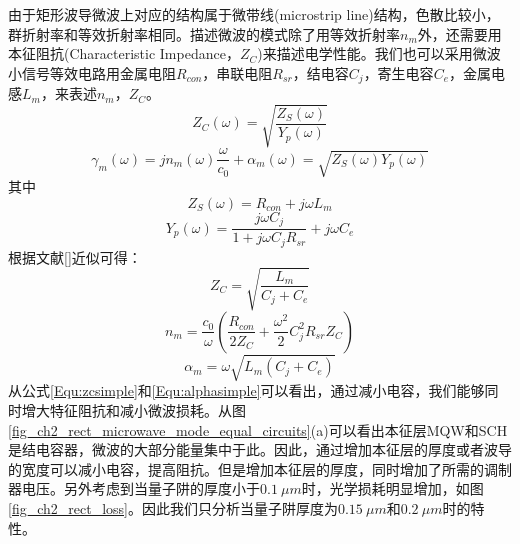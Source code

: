 由于矩形波导微波上对应的结构属于微带线(microstrip  line)结构，色散比较小，群折射率和等效折射率相同。描述微波的模式除了用等效折射率$n_m$外，还需要用本征阻抗(Characteristic Impedance，$Z_C$)来描述电学性能。我们也可以采用微波小信号等效电路用金属电阻$R_{con}$，串联电阻$R_{sr}$，结电容$C_j$，寄生电容$C_e$，金属电感$L_m$，来表述$n_m$，$Z_C$。
\begin{equation}
\label{Equ:zc}
Z_C(\omega) = \sqrt{\frac{Z_S(\omega)}{Y_p(\omega)}}
\end{equation}
\begin{equation}
\label{Equ:gammam}
\gamma_m(\omega) = jn_m(\omega)\frac{\omega}{c_0} + \alpha_m(\omega) = \sqrt{Z_S(\omega)Y_p(\omega)}
\end{equation}
其中
\begin{equation}
\label{Equ:zs}
Z_S(\omega) = R_{con}+j\omega L_m
\end{equation}
\begin{equation}
\label{Equ:yp}
Y_p(\omega) = \frac{j\omega C_j}{1+j\omega C_jR_{sr}}+j\omega C_e
\end{equation}
根据文献[]近似可得：
\begin{equation}
\label{Equ:zcsimple}
Z_C = \sqrt{\frac{L_m}{C_j+C_e}}
\end{equation}
\begin{equation}
\label{Equ:nmsimple}
n_m = \frac{c_0}{\omega}\left(\frac{R_{con}}{2Z_C} + \frac{\omega^2}{2}C^2_jR_{sr}Z_C\right)
\end{equation}
\begin{equation}
\label{Equ:alphasimple}
\alpha_m = \omega\sqrt{L_m(C_j+C_e)}
\end{equation}
从公式\ref{Equ:zcsimple}和\ref{Equ:alphasimple}可以看出，通过减小电容，我们能够同时增大特征阻抗和减小微波损耗。从图\ref{fig_ch2_rect_microwave_mode_equal_circuits}(a)可以看出本征层MQW和SCH是结电容器，微波的大部分能量集中于此。因此，通过增加本征层的厚度或者波导的宽度可以减小电容，提高阻抗。但是增加本征层的厚度，同时增加了所需的调制器电压。另外考虑到当量子阱的厚度小于$0.1 ~\mu m$时，光学损耗明显增加，如图\ref{fig_ch2_rect_loss}。因此我们只分析当量子阱厚度为$0.15~ \mu m$和$0.2 ~\mu m$时的特性。
